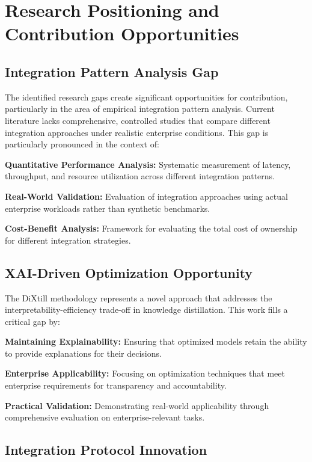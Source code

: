 \section{Research Positioning and Contribution Opportunities}

\subsection{Integration Pattern Analysis Gap}

The identified research gaps create significant opportunities for contribution, particularly in the area of empirical integration pattern analysis. Current literature lacks comprehensive, controlled studies that compare different integration approaches under realistic enterprise conditions. This gap is particularly pronounced in the context of:

\textbf{Quantitative Performance Analysis:} Systematic measurement of latency, throughput, and resource utilization across different integration patterns.

\textbf{Real-World Validation:} Evaluation of integration approaches using actual enterprise workloads rather than synthetic benchmarks.

\textbf{Cost-Benefit Analysis:} Framework for evaluating the total cost of ownership for different integration strategies.

\subsection{XAI-Driven Optimization Opportunity}

The DiXtill methodology \cite{XaiDrivenKnowledge} represents a novel approach that addresses the interpretability-efficiency trade-off in knowledge distillation. This work fills a critical gap by:

\textbf{Maintaining Explainability:} Ensuring that optimized models retain the ability to provide explanations for their decisions.

\textbf{Enterprise Applicability:} Focusing on optimization techniques that meet enterprise requirements for transparency and accountability.

\textbf{Practical Validation:} Demonstrating real-world applicability through comprehensive evaluation on enterprise-relevant tasks.

\subsection{Integration Protocol Innovation}

